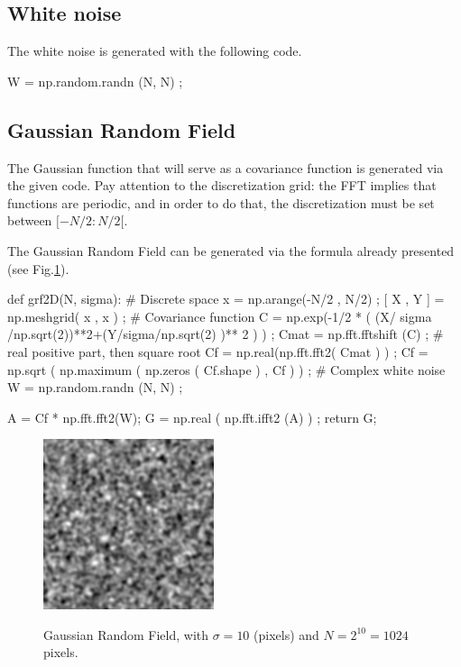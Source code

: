 \def\QRCODE{MASTER_mispa_TUT.IMG.gaussian_random_fields_pythonqrcode.png}
\def\QRPAGE{http://www.iptutorials.science/tree/master/MASTER_mispa/TUT.IMG.gaussian_random_fields/python}
\def\difficulty{3}

\subsection{White noise}
The white noise is generated with the following code.
\begin{python}
W = np.random.randn (N, N) ;
\end{python}

\subsection{Gaussian Random Field}
The Gaussian function that will serve as a covariance function is generated via the given code. Pay attention to the discretization grid: 
the FFT implies that functions are periodic, and in order to do that, the discretization must be set between $[-N/2:N/2[$.


The Gaussian Random Field can be generated via the formula already presented (see Fig.\ref{fig:grf:python:grf}).
\begin{python}
def grf2D(N, sigma):
    # Discrete space
    x = np.arange(-N/2 , N/2) ;
    [ X , Y ] = np.meshgrid( x , x ) ;
    # Covariance function
    C = np.exp(-1/2 * ( (X/ sigma /np.sqrt(2))**2+(Y/sigma/np.sqrt(2) )** 2 ) ) ;
    Cmat = np.fft.fftshift (C) ;
    # real positive part, then square root
    Cf = np.real(np.fft.fft2( Cmat ) ) ;
    Cf = np.sqrt ( np.maximum ( np.zeros ( Cf.shape ) , Cf ) ) ;
    # Complex white noise
    W = np.random.randn (N, N) ;
    
    A = Cf * np.fft.fft2(W);
    G = np.real ( np.fft.ifft2 (A) ) ;
    return G;
\end{python}

\begin{figure}[htbp]
 \centering\caption{Gaussian Random Field, with $\sigma=10$ (pixels) and $N=2^{10}=1024$ pixels.}%
 \includegraphics[width=5cm]{grf.python.png}%
 \label{fig:grf:python:grf}%
\end{figure}


